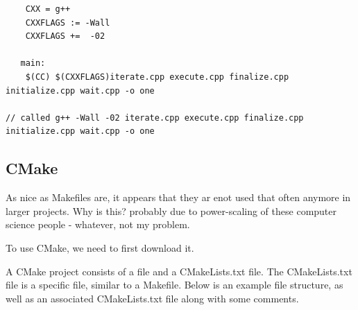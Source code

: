 \begin{verbatim}
    CXX = g++
    CXXFLAGS := -Wall
    CXXFLAGS +=  -02

   main:
    $(CC) $(CXXFLAGS)iterate.cpp execute.cpp finalize.cpp initialize.cpp wait.cpp -o one

// called g++ -Wall -02 iterate.cpp execute.cpp finalize.cpp initialize.cpp wait.cpp -o one
\end{verbatim}

\subsection{CMake}

As nice as Makefiles are, it appears that they ar enot used that often anymore in larger projects. Why is this? probably due to power-scaling of these computer science people - whatever, not my problem. 

To use CMake, we need to first download it.

A CMake project consists of a file and a CMakeLists.txt file. The CMakeLists.txt file is a specific file, similar to a Makefile. Below is an example file structure, as well as an associated CMakeLists.txt file along with some comments.


